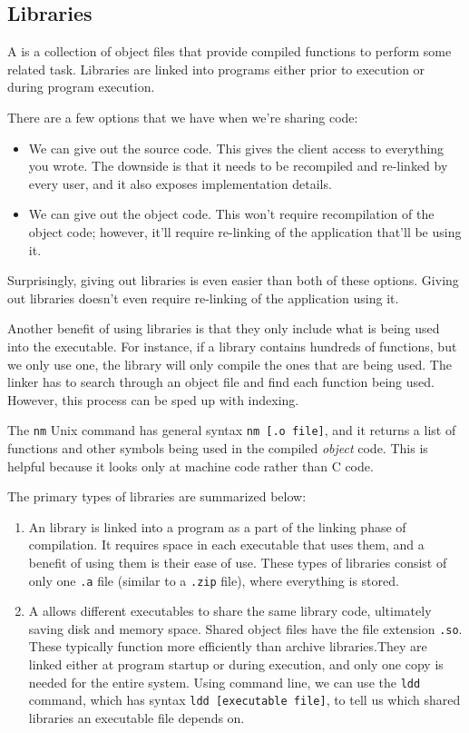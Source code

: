 \subsection{Libraries}

A  is a collection of object files that provide compiled functions to perform some related task. Libraries are linked into programs either prior to execution or during program execution.


There are a few options that we have when we're sharing code: \begin{itemize}
    \item We can give out the source code. This gives the client access to everything you wrote. The downside is that it needs to be recompiled and re-linked by every user, and it also exposes implementation details.
    \item We can give out the object code. This won't require recompilation of the object code; however, it'll require re-linking of the application that'll be using it.
\end{itemize}


Surprisingly, giving out libraries is even easier than both of these options. Giving out libraries doesn't even require re-linking of the application using it. 

Another benefit of using libraries is that they only include what is being used into the executable. For instance, if a library contains hundreds of functions, but we only use one, the library will only compile the ones that are being used. The linker has to search through an object file and find each function being used. However, this process can be sped up with indexing. 




The \verb!nm! Unix command has general syntax \verb!nm [.o file]!, and it returns a list of functions and other symbols being used in the compiled \textit{object} code. This is helpful because it looks only at machine code rather than C code. 


The primary types of libraries are summarized below:

\begin{enumerate}
    \item An  library is linked into a program as a part of the linking phase of compilation. It requires space in each executable that uses them, and a benefit of using them is their ease of use. These types of libraries consist of only one \verb!.a! file (similar to a \verb!.zip! file), where everything is stored.
    \item A  allows different executables to share the same library code, ultimately saving disk and memory space. Shared object files have the file extension \verb!.so!. These typically function more efficiently than archive libraries.They are linked either at program startup or during execution, and only one copy is needed for the entire system. Using command line, we can use the \verb!ldd! command, which has syntax \verb!ldd [executable file]!, to tell us which shared libraries an executable file depends on.
\end{enumerate}


